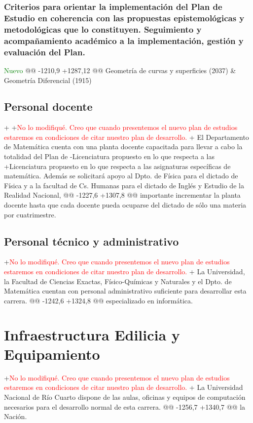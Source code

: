 \begin{description}
{ \subsubsection{Criterios para orientar la implementación del Plan de Estudio en coherencia con las propuestas epistemológicas y metodológicas que lo constituyen. Seguimiento y acompañamiento académico a la implementación, gestión y evaluación del Plan.
 } \textcolor{green}{Nuevo}
@@ -1210,9 +1287,12 @@ Geometría de curvas y superficies  (2037)  & Geometría Diferencial (1915)
 
 
 \subsection{Personal docente}
+
+\textcolor{red}{No lo modifiqué. Creo que cuando presentemos el nuevo plan de estudios estaremos en condiciones de citar nuestro plan de desarrollo.}
+
 El Departamento de Matemática cuenta con una planta docente
 capacitada para llevar a cabo la totalidad del Plan de
-Licenciatura propuesto en lo que \linebreak respecta a las
+Licenciatura propuesto en lo que  respecta a las
 asignaturas específicas de matemática. Además se solicitará apoyo
 al Dpto. de Física para el dictado de Física y a la facultad de
 Cs. Humanas para el dictado de Inglés y Estudio de la Realidad Nacional,
@@ -1227,6 +1307,8 @@ importante incrementar la planta docente hasta que cada docente
 pueda ocuparse del dictado de sólo una materia por cuatrimestre.
 
 \subsection{Personal técnico y administrativo}
+\textcolor{red}{No lo modifiqué. Creo que cuando presentemos el nuevo plan de estudios estaremos en condiciones de citar nuestro plan de desarrollo.}
+
 La Universidad, la Facultad de Ciencias Exactas, Físico-Químicas y
 Naturales y el Dpto. de Matemática cuentan con personal
 administrativo suficiente para desarrollar esta carrera.
@@ -1242,6 +1324,8 @@ especializado en informática.
 
 
 \section{Infraestructura Edilicia y Equipamiento}
+\textcolor{red}{No lo modifiqué. Creo que cuando presentemos el nuevo plan de estudios estaremos en condiciones de citar nuestro plan de desarrollo.}
+
  La Universidad
 Nacional de Río Cuarto dispone de las aulas, oficinas y equipos de
 computación necesarios para el desarrollo normal de esta carrera.
@@ -1256,7 +1340,7 @@ la Nación.
 
}
\end{description}
